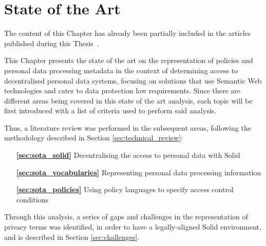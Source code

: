 \chapter{State of the Art}
\label{chap:sota}

\begin{tcolorbox}[colback=royallavender!40]
The content of this Chapter has already been partially included in the articles published during this Thesis~\citep{esteves_odrl_2021,esteves_analysis_2022,asgarinia_who_2023,esteves_using_2023,florea_is_2023}.
\end{tcolorbox}

This Chapter presents the state of the art on the representation of policies and personal data processing metadata in the context of determining access to decentralised personal data systems, focusing on solutions that use Semantic Web technologies and cater to data protection law requirements.
Since there are different areas being covered in this state of the art analysis, each topic will be first introduced with a list of criteria used to perform said analysis. 

Thus, a literature review was performed in the subsequent areas, following the methodology described in Section \ref{sec:technical_review}:

\begin{itemize}
    \item [\textbf{\ref{sec:sota_solid}}] Decentralising the access to personal data with Solid
    \item [\textbf{\ref{sec:sota_vocabularies}}] Representing personal data processing information
    \item [\textbf{\ref{sec:sota_policies}}] Using policy languages to specify access control conditions
\end{itemize}

Through this analysis, a series of gaps and challenges in the representation of privacy terms was identified, in order to have a legally-aligned Solid environment, and is described in Section \ref{sec:challenges}.







